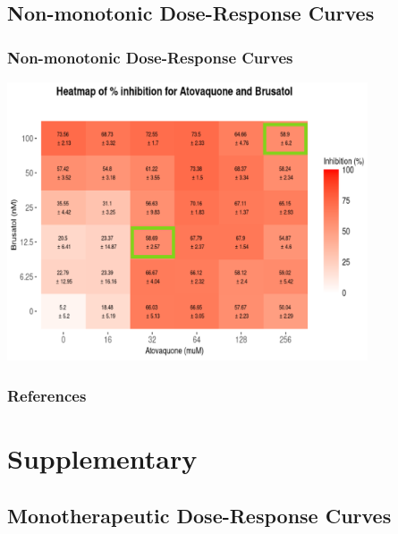 \documentclass{beamer}
\begin{document}
 
\subsection{Non-monotonic Dose-Response Curves}

\begin{frame}
  \frametitle{Non-monotonic Dose-Response Curves}

    \centering
    
    \includegraphics[width=0.8\textwidth]{figs/response-heatmap-all-annotated.png}
\end{frame}


\begin{frame}[allowframebreaks]
    \frametitle{References}
    
    
    \nocite{CHENG2021111652}
    \nocite{CHOU1976253}
    \nocite{Ianevski2020-sv}
    \nocite{drugcombdb}
    \nocite{synergyfinder}
\end{frame}

\section{Supplementary}


\subsection{Monotherapeutic Dose-Response Curves}
\end{document}

